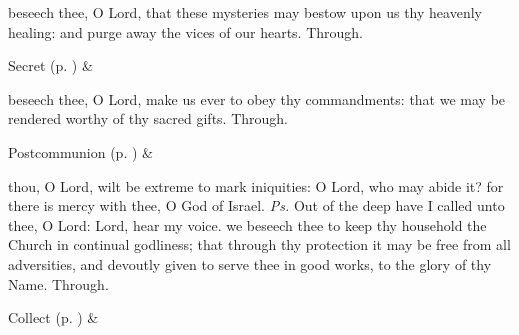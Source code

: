 
\vspace{-0.25\baselineskip}

\secret
{} beseech thee, O Lord, that these mysteries may bestow upon us thy heavenly healing: and purge away the vices of our hearts. Through.


\begin{rubric}
     Secret  (p. \pageref{SPSaints}) \&  
\end{rubric}


\vspace{-0.25\baselineskip}

\postcommunion
{} beseech thee, O Lord, make us ever to obey thy commandments: that we may be rendered worthy of thy sacred gifts. Through.


\begin{rubric}
     Postcommunion  (p. \pageref{SPSaints}) \&  
\end{rubric}


\clearpage
{}


\introit
{} thou, O Lord, wilt be extreme to mark iniquities: O Lord, who may abide it? for there is mercy with thee, O God of Israel. \textit{Ps.} Out of the deep have I called unto thee, O Lord: Lord, hear my voice.
\collect
{} we beseech thee to keep thy household the Church in continual godliness; that through thy protection it may be free from all adversities, and devoutly given to serve thee in good works, to the glory of thy Name. Through.
\begin{rubric}
     Collect  (p. \pageref{SPSaints}) \&  
\end{rubric}

